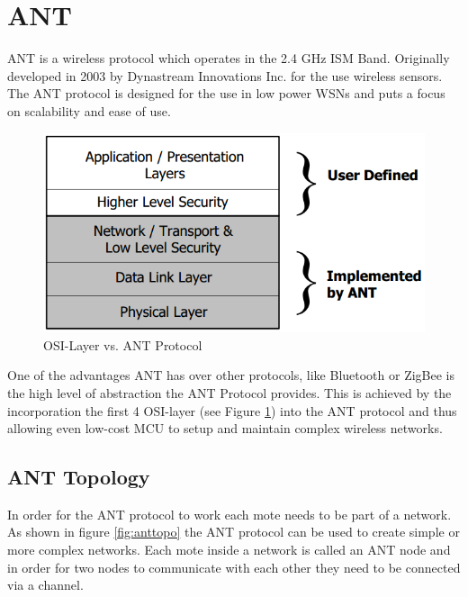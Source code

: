 \section{ANT}
ANT \cite{DynastreamInnovationsInc.2013} is a wireless protocol which operates in the 2.4 GHz ISM Band. Originally developed in 2003 by Dynastream Innovations Inc. for the use wireless sensors. The ANT protocol is designed for the use in low power WSNs and puts a focus on scalability and ease of use.
\begin{figure}[h]
\centering
\includegraphics[scale=.5]{./pics/ANTstack.png}
\caption{OSI-Layer vs. ANT Protocol}\label{fig:osilayer}
\end{figure}
One of the advantages ANT has over other protocols, like Bluetooth or ZigBee is the high level of abstraction the ANT Protocol provides. This is achieved by the incorporation the first 4 OSI-layer (see Figure \ref{fig:osilayer}) into the ANT protocol and thus allowing even low-cost MCU to setup and maintain complex wireless networks.

\subsection{ANT Topology}
In order for the ANT protocol to work each mote needs to be part of a network. As shown in figure \ref{fig:anttopo} the ANT protocol can be used to create simple or more complex networks. Each mote inside a network is called an ANT node and in order for two nodes to communicate with each other they need to be connected via a channel.


